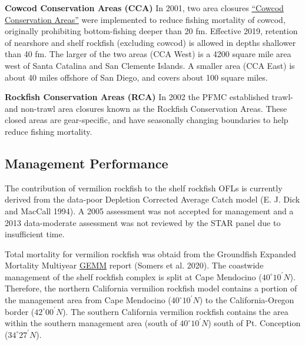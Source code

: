\documentclass[11pt,
  english,
  a4paper,
]{article}
\begin{document}
\textbf{Cowcod Conservation Areas (CCA)} In 2001, two area closures {\href{https://nrm.dfg.ca.gov/FileHandler.ashx?DocumentID=36132\&inline}{``Cowcod Conservation Areas''}\leavevmode\tagmcend\tagstructend} were implemented to reduce fishing mortality of cowcod, originally prohibiting bottom-fishing deeper than 20 fm. Effective 2019, retention of nearshore and shelf rockfish (excluding cowcod) is allowed in depths shallower than 40 fm. The larger of the two areas (CCA West) is a 4200 square mile area west of Santa Catalina and San Clemente Islands. A smaller area (CCA East) is about 40 miles offshore of San Diego, and covers about 100 square miles.

\textbf{Rockfish Conservation Areas (RCA)} In 2002 the PFMC established trawl- and non-trawl area closures known as the Rockfish Conservation Areas. These closed areas are gear-specific, and have seasonally changing boundaries to help reduce fishing mortality.


\hypertarget{management-performance-1}{%
\subsection{Management Performance}\label{management-performance-1}}

\leavevmode\tagmcend\tagstructend

The contribution of vermilion rockfish to the shelf rockfish OFLs is currently derived from the data-poor Depletion Corrected Average Catch model {(E. J. Dick and MacCall 1994)\leavevmode\tagmcend\tagstructend}. A 2005 assessment was not accepted for management and a 2013 data-moderate assessment was not reviewed by the STAR panel due to insufficient time.

Total mortality for vermilion rockfish was obtaid from the Groundfish Expanded Mortality Multiyear {\href{https://www.nwfsc.noaa.gov/data/api/v1/source/observer.gemm_fact/selection.xlsx}{GEMM}\leavevmode\tagmcend\tagstructend} report {(Somers et al. 2020)\leavevmode\tagmcend\tagstructend}. The coastwide management of the shelf rockfish complex is split at Cape Mendocino ($40^\circ 10^\prime N$). Therefore, the northern California vermilion rockfish model contains a portion of the management area from Cape Mendocino ($40^\circ 10^\prime N$) to the California-Oregon border ($42^\circ 00^\prime N$). The southern California vermilion rockfish contains the area within the southern management area (south of $40^\circ 10^\prime N$) south of Pt. Conception ($34^\circ 27^\prime N$).
\end{document}
